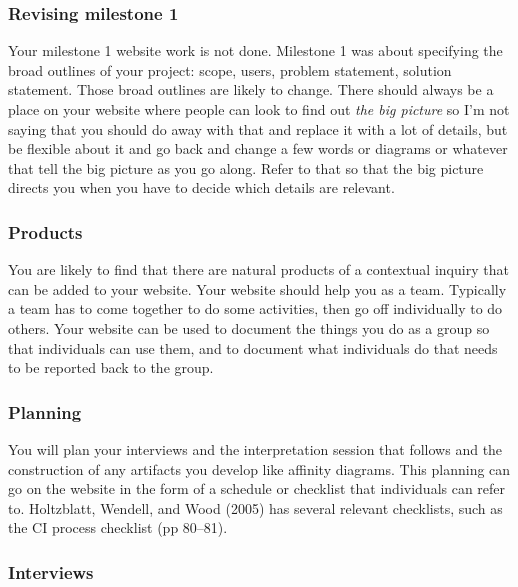 \hypertarget{revising-milestone-1}{%
\subsubsection{Revising milestone 1}\label{revising-milestone-1}}

Your milestone 1 website work is not done. Milestone 1 was about
specifying the broad outlines of your project: scope, users, problem
statement, solution statement. Those broad outlines are likely to
change. There should always be a place on your website where people can
look to find out \emph{the big picture} so I'm not saying that you
should do away with that and replace it with a lot of details, but be
flexible about it and go back and change a few words or diagrams or
whatever that tell the big picture as you go along. Refer to that so
that the big picture directs you when you have to decide which details
are relevant.

\hypertarget{products}{%
\subsubsection{Products}\label{products}}

You are likely to find that there are natural products of a contextual
inquiry that can be added to your website. Your website should help you
as a team. Typically a team has to come together to do some activities,
then go off individually to do others. Your website can be used to
document the things you do as a group so that individuals can use them,
and to document what individuals do that needs to be reported back to
the group.

\hypertarget{planning}{%
\subsubsection{Planning}\label{planning}}

You will plan your interviews and the interpretation session that
follows and the construction of any artifacts you develop like affinity
diagrams. This planning can go on the website in the form of a schedule
or checklist that individuals can refer to. Holtzblatt, Wendell, and
Wood (2005) has several relevant checklists, such as the CI process
checklist (pp 80--81).

\hypertarget{interviews}{%
\subsubsection{Interviews}\label{interviews}}

